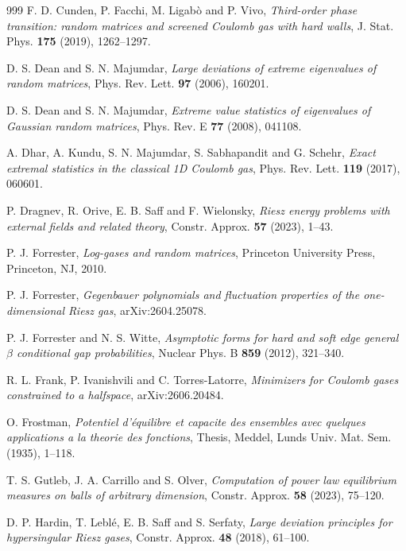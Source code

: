 \documentclass{amsart}
\theoremstyle{plain}
\theoremstyle{remark}
\numberwithin{equation}{section}
\begin{document}
\begin{thebibliography}{999}
 F. D. Cunden, P. Facchi, M. Ligabò  and P. Vivo, {\it Third-order phase transition: random matrices and screened Coulomb gas with hard walls}, J. Stat. Phys. {\bf 175} (2019), 1262--1297. 

 D. S. Dean and S. N. Majumdar, \emph{Large deviations of extreme eigenvalues of random matrices}, Phys. Rev. Lett. \textbf{97} (2006), 160201. 

 D. S. Dean and S. N. Majumdar, \emph{Extreme value statistics of eigenvalues of Gaussian random matrices}, Phys. Rev. E \textbf{77} (2008), 041108. 


 A. Dhar, A. Kundu, S. N. Majumdar, S. Sabhapandit and G. Schehr, \emph{Exact extremal statistics in the classical 1D Coulomb gas}, Phys. Rev. Lett. \textbf{119} (2017), 060601. 


 P. Dragnev, R. Orive, E. B. Saff and F. Wielonsky, \textit{Riesz energy problems with external fields and related theory}, Constr. Approx. \textbf{57} (2023), 1--43.

 

 P. J. Forrester, \emph{Log-gases and random matrices}, Princeton University Press, Princeton, NJ, 2010.

 P. J. Forrester, \emph{Gegenbauer polynomials and fluctuation properties of the one-dimensional Riesz gas}, arXiv:2604.25078.


 P. J. Forrester and N. S. Witte, \emph{Asymptotic forms for hard and soft edge general $\beta$ conditional gap probabilities}, Nuclear Phys. B \textbf{859} (2012), 321--340. 
 

 R. L. Frank, P. Ivanishvili and C. Torres-Latorre, \emph{Minimizers for Coulomb gases constrained to a halfspace}, arXiv:2606.20484.


 O. Frostman, \emph{Potentiel d'\'equilibre et capacite des ensembles avec quelques applications a la theorie des fonctions}, Thesis, Meddel, Lunds Univ. Mat. Sem.  (1935), 1--118.

 T. S. Gutleb, J. A. Carrillo and S. Olver, \emph{Computation of power law equilibrium measures on balls of arbitrary dimension}, Constr. Approx. \textbf{58} (2023), 75--120.

 D. P. Hardin, T. Lebl{\'e}, E. B. Saff and S. Serfaty, {\it Large deviation principles for hypersingular Riesz gases}, Constr. Approx. {\bf 48} (2018), 61--100.





\end{thebibliography}
\end{document}
